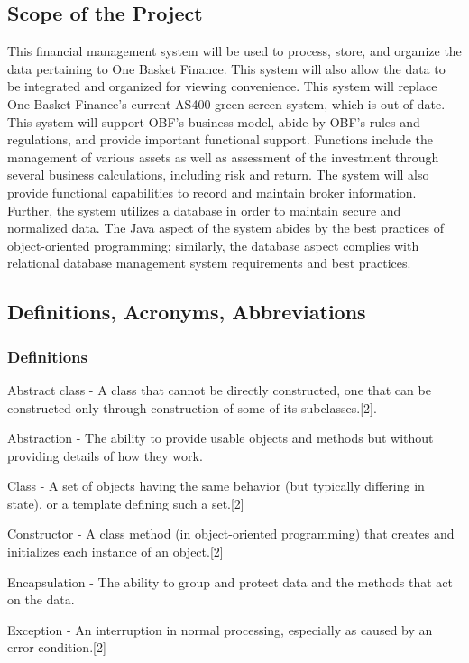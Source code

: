 \documentclass[12pt]{scrartcl} %
\begin{document}
    \subsection{Scope of the Project}

    This financial management system will be used to process, store, and organize the data pertaining to One Basket Finance.  This system will also allow the data to be integrated and organized for viewing convenience.  This system will replace One Basket Finance's current AS400 green-screen system, which is out of date.  This system will support OBF's business model, abide by OBF's rules and regulations, and provide important functional support.  Functions include the management of various assets as well as assessment of the investment through several business calculations, including risk and return.  The system will also provide functional capabilities to record and maintain broker information.  Further, the system utilizes a database in order to maintain secure and normalized data.  The Java aspect of the system abides by the best practices of object-oriented programming; similarly, the database aspect complies with relational database management system requirements and best practices.

    \subsection{Definitions, Acronyms, Abbreviations}

    \subsubsection{Definitions}

    Abstract class - A class that cannot be directly constructed, one that can be constructed only through construction of some of its subclasses.[2].

    Abstraction - The ability to provide usable objects and methods but without providing details of how they work.

    Class - A set of objects having the same behavior (but typically differing in state), or a template defining such a set.[2]

    Constructor - A class method (in object-oriented programming) that creates and initializes each instance of an object.[2]

    Encapsulation - The ability to group and protect data and the methods that act on the data.

    Exception - An interruption in normal processing, especially as caused by an error condition.[2]
\end{document}

